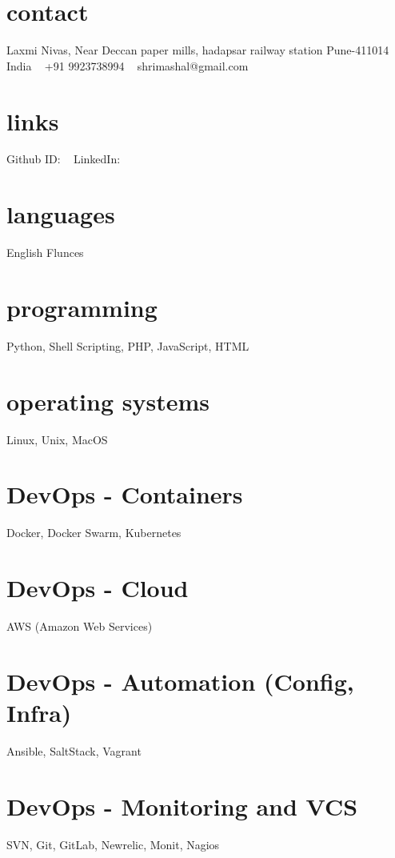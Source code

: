 \documentclass[]{cv-style}          %
\begin{document}

\lastupdated


\begin{aside}
%
\section{contact}\small
Laxmi Nivas,
Near Deccan paper mills,
hadapsar railway station 
Pune-411014
India
~
+91 9923738994
~
shrimashal@gmail.com
~
%
\section{links}
Github ID:
~
LinkedIn:
~
%
\section{languages}
English Flunces
%
\section{programming}
Python, Shell Scripting,
PHP, JavaScript, HTML
%
\section{operating systems}
Linux, Unix, MacOS
%
\section{DevOps - Containers}
Docker, Docker Swarm, 
Kubernetes
%
\section{DevOps - Cloud}
AWS (Amazon Web Services)
%
\section{DevOps - Automation (Config, Infra)}
Ansible, SaltStack, Vagrant
%
\section{DevOps - Monitoring and VCS}
SVN, Git, GitLab, Newrelic, Monit, Nagios
%
\end{aside}
\end{document}
